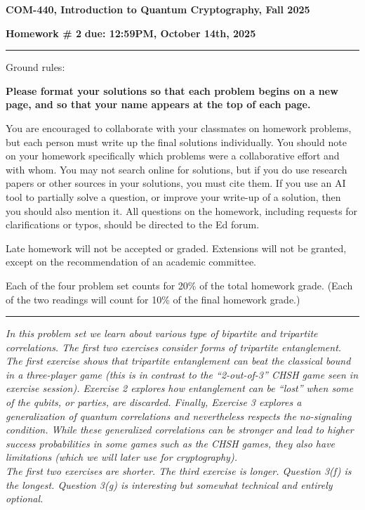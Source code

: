\documentclass[12pt]{article}
\newcommand{\header}[1]{\begin{center} {\large\bf #1} \end{center}}
\begin{document}
\header{COM-440, Introduction to Quantum Cryptography, Fall 2025}
{\bf Homework \# 2} \hfill {\bf due: 12:59PM, October 14th, 2025}


\medskip

\hrule

\medskip 

Ground rules: 

{\bf Please
  format your solutions so that each problem begins on a new page, and
  so that your name appears at the top of each page.}

You are encouraged to collaborate with your classmates on
homework problems, but each person must write up the final solutions
individually. You should note on your homework specifically which
problems were a collaborative effort and with whom. You may not search
online for solutions, but if you do use research papers or other
sources in your solutions, you must cite them. If you use an AI tool to 
partially solve a question, or improve your write-up of a solution, then 
you should also mention it. All questions on the homework, including requests for clarifications or typos, should be directed to the Ed forum.

Late homework will not be accepted or graded. Extensions will not be granted, except on the recommendation of an academic committee. 

Each of the four problem set counts for 20\% of the total homework grade. (Each of the two readings will count for 10\% of the final homework grade.)


\medskip

\hrule

\medskip

\emph{In this problem set we learn about various type of bipartite and tripartite correlations. The first two exercises consider forms of tripartite entanglement. The first exercise shows that tripartite entanglement can beat the classical bound in a three-player game (this is in contrast to the ``2-out-of-3'' CHSH game seen in exercise session). Exercise 2 explores how entanglement can be ``lost'' when some of the qubits, or parties, are discarded. Finally, Exercise 3 explores a generalization of quantum correlations and nevertheless respects the no-signaling condition. While these generalized correlations can be stronger and lead to higher success probabilities in some games such as the CHSH games, they also have limitations (which we will later use for cryptography).\\
The first two exercises are shorter. The third exercise is longer. Question 3(f) is the longest. Question 3(g) is interesting but somewhat technical and entirely optional.}
\end{document}
